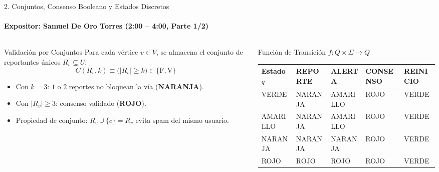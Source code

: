 \documentclass[aspectratio=169]{beamer}
\begin{document}
\begin{frame}{2. Conjuntos, Consenso Booleano y Estados Discretos}
    \framesubtitle{Expositor: Samuel De Oro Torres (2:00 -- 4:00, Parte 1/2)}
    \begin{columns}[T]
        \begin{column}{0.47\textwidth}
            \begin{block}{Validación por Conjuntos}
                Para cada vértice $v \in V$, se almacena el conjunto de reportantes únicos $R_v \subseteq U$:
                \[
                    C(R_v, k) \equiv \bigl(|R_v| \ge k\bigr) \in \{\text{F}, \text{V}\}
                \]
                \scriptsize
                \begin{itemize}
                    \item Con $k = 3$: $1$ o $2$ reportes no bloquean la vía (\textbf{NARANJA}).
                    \item Con $|R_v| \ge 3$: consenso validado (\textbf{ROJO}).
                    \item Propiedad de conjunto: $R_v \cup \{c\} = R_v$ evita spam del mismo usuario.
                \end{itemize}
            \end{block}
        \end{column}
        \begin{column}{0.51\textwidth}
            \begin{block}{Función de Transición $f: Q \times \Sigma \to Q$}
                \tiny
                \setlength{\tabcolsep}{3pt}
                \begin{tabular}{@{}lllll@{}}
                    \toprule
                    \textbf{Estado $q$} & \textbf{REPORTE} & \textbf{ALERTA} & \textbf{CONSENSO} & \textbf{REINICIO} \\
                    \midrule
                    VERDE    & NARANJA & AMARILLO & ROJO & VERDE \\
                    AMARILLO & NARANJA & AMARILLO & ROJO & VERDE \\
                    NARANJA  & NARANJA & NARANJA  & ROJO & VERDE \\
                    ROJO     & ROJO    & ROJO     & ROJO & VERDE \\
                    \bottomrule

\end{tabular}
\end{block}
\end{column}
\end{columns}
\end{frame}
\end{document}

